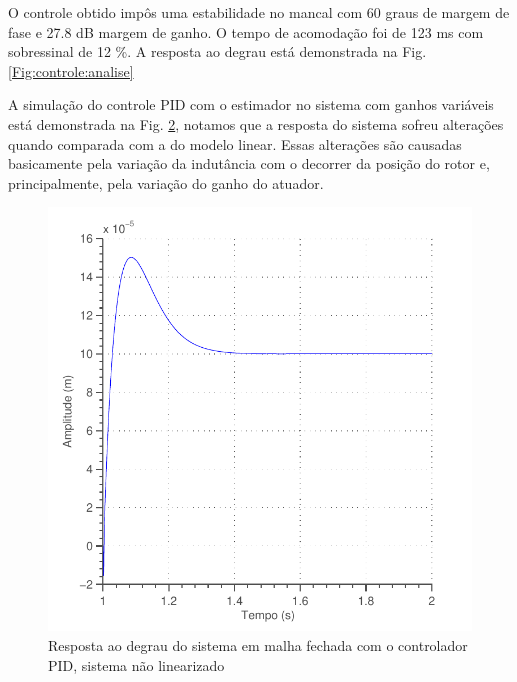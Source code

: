 O controle obtido impôs uma estabilidade no mancal com 60 graus de margem de fase e 27.8 dB margem de ganho. O tempo de acomodação foi de 123 ms com sobressinal de 12 \%. A resposta ao degrau está demonstrada na Fig. \ref{Fig:controle:analise}

\begin{figure}[ht!]
\centering

\label{fig:controle:degrau}
\end{figure}

A simulação do controle PID com o estimador no sistema com ganhos variáveis está demonstrada na Fig. \ref{fig:pid_nlinear_degrau}, notamos que a resposta do sistema sofreu alterações quando comparada com a do modelo linear. Essas alterações são causadas basicamente pela variação da indutância com o decorrer da posição do rotor e, principalmente, pela variação do ganho do atuador.

\begin{figure}
\centering
\includegraphics[width=0.7\linewidth]{Figs/controle/pid_nlinear_degrau}
\caption{Resposta ao degrau do sistema em malha fechada com o controlador PID, sistema não linearizado}
\label{fig:pid_nlinear_degrau}
\end{figure}

